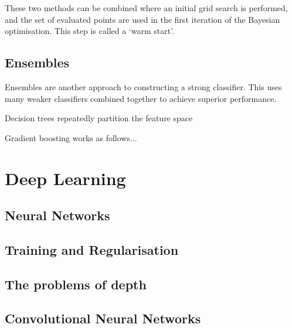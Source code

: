 These two methods can be combined where an initial grid search is performed, and the set of evaluated points are used in the first iteration of the Bayesian optimisation. 
This step is called a `warm start'. 



\subsection{Ensembles}

Ensembles are another approach to constructing a strong classifier. This uses many weaker classifiers combined together to achieve superior performance. 

Decision trees repeatedly partition the feature space

Gradient boosting works as follows...

\section{Deep Learning}

\subsection{Neural Networks}

\subsection{Training and Regularisation}

\subsection{The problems of depth}

\subsection{Convolutional Neural Networks}
